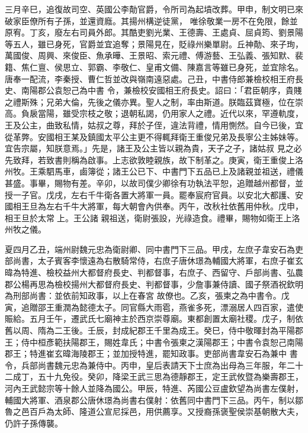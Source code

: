 \begin{pinyinscope}
 三月辛巳，追復故司空、英國公李勣官爵，令所司為起墳改葬。甲申，制文明已來破家臣僚所有子孫，並還資廕。其揚州構逆徒黨，
 唯徐敬業一房不在免限，餘並原宥。丁亥，廢左右司員外郎。其酷吏劉光業、王德壽、王處貞、屈貞筠、劉景陽等五人，雖已身死，官爵並宜追奪；景陽見在，貶祿州樂單尉。丘神勣、來子珣，萬國俊、周興、來俊臣、魚承曄、王景昭、索元禮、傅游藝、王弘義、張知默、裴籍、焦仁亶、侯思立、郭霸、李敬仁、皇甫文備、陳嘉言等雖已身死，並宜除名。唐奉一配流，李秦授、曹仁哲並改與嶺南遠惡處。己丑，中書侍郎兼檢校相王府長史、南陽郡公袁恕己為中書
 令，兼檢校安國相王府長史。詔曰：「君臣朝序，貴賤之禮斯殊；兄弟大倫，先後之儀亦異。聖人之制，率由斯道。朕臨茲寶極，位在崇高。負扆當陽，雖受宗枝之敬；退朝私謁，仍用家人之禮。近代以來，罕遵軌度，王及公主，曲致私情，姑叔之尊，拜於子侄，違法背禮，情用惻然。自今已後，宜從革弊。安國相王某及鎮國太平公主更不得輒拜衛王重俊兄弟及長寧公主姊妹等。宜告宗屬，知朕意焉。」先是，諸王及公主皆以親為貴，天子之子，諸姑叔
 見之必先致拜，若致書則稱為啟事。上志欲敦睦親族，故下制革之。庚寅，衛王重俊上洛州牧。王乘駟馬車，鹵簿從；諸王公已下、中書門下五品已上及諸親並祖送，禮儀甚盛。事畢，賜物有差。辛卯，以故司僕少卿徐有功執法平恕，追贈越州都督，並授一子官。戊戌，左右千牛衛各置大將軍一員。罷奉宸府官員。以安北大都護、安國相王旦為左右千牛大將軍，每大朝會內供奉。丙午，改秋社依舊用仲秋。戊申，相王旦於太常上。王公諸
 親祖送，衛尉張設，光祿造食。禮畢，賜物如衛王上洛州牧之儀。



 夏四月乙丑，端州尉魏元忠為衛尉卿、同中書門下三品。甲戌，左庶子韋安石為吏部尚書，太子賓客李懷遠為右散騎常侍，右庶子唐休璟為輔國大將軍，右庶子崔玄暐為特進、檢校益州大都督府長史、判都督事，右庶子、西留守、戶部尚書、弘農郡公楊再思為檢校揚州大都督府長史、判都督事，少詹事兼侍讀、國子祭酒祝欽明為刑部尚書：並依前知政事，以上在春宮
 故僚也。乙亥，張柬之為中書令。戊寅，追贈邵王重潤為懿德太子。同官縣大雨雹，燕雀多死，漂溺居人四百家，遣使賑給。五月壬午，遷武氏七廟神主於西京崇尊廟。東都創置太廟社稷。戊子，制依舊以周、隋為二王後。壬辰，封成紀郡王千里為成王。癸巳，侍中敬暉封為平陽郡王；侍中桓彥範扶陽郡王，賜姓韋氏；中書令張柬之漢陽郡王；中書令袁恕己南陽郡王；特進崔玄暐海陵郡王；並加授特進，罷知政事。吏部尚書韋安石為兼中
 書令，兵部尚書魏元忠為兼侍中。丙申，皇后表請天下士庶為出母為三年服，年二十二成丁，五十九免役。癸卯，降梁王武三思為德靜郡王，定王武攸暨為樂壽郡王，河內王武懿宗等十餘人並降為國公。甲辰，特進、芮國公豆盧欽望為尚書左僕射，輔國大將軍、酒泉郡公唐休璟為尚書右僕射：依舊同中書門下三品。丙午，制以鄒魯之邑百戶為太師、隆道公宣尼採邑，用供薦享。又授裔孫褒聖侯崇基朝散大夫，仍許子孫傳襲。




\end{pinyinscope}
